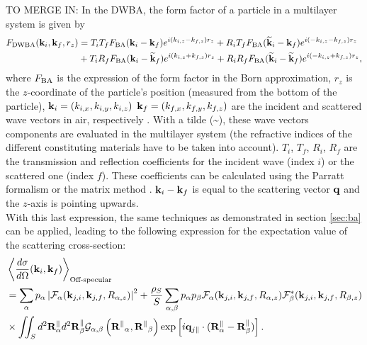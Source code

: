 TO MERGE IN:
In the DWBA, the form factor of a particle in a multilayer system is given by
\begin{align}
F_{\rm{DWBA}} (\mathbf{k}_i,\mathbf{k}_f, r_z) & = T_i T_f F_{\rm{BA}} (\mathbf{k}_i-\mathbf{k}_f) e^{i (k_{i,z}-k_{f,z}) r_z} + R_i T_f F_{\rm{BA}}(\mathbf{\widetilde{k}}_i-\mathbf{k}_f) e^{i(-k_{i,z}-k_{f,z})r_z}
 \nonumber \\
  &+ T_i R_f F_{\rm{BA}}(\mathbf{k}_i-\mathbf{\widetilde{k}}_f)e^{i(k_{i,z}+k_{f,z})r_z} + R_iR_fF_{\rm{BA}} (\mathbf{\widetilde{k}}_i-\mathbf{\widetilde{k}}_f)e^{i(-k_{i,z}+k_{f,z})r_z}, \label{eq:dwbageneral}
\end{align}
where $F_{\rm{BA}}$ is the expression of the form factor in the Born approximation, $r_z$ is the $z$-coordinate of the particle's position (measured from the bottom of the particle), $\mathbf{k}_i=(k_{i,x}, k_{i,y}, k_{i,z})$ $\mathbf{k}_f=(k_{f,x}, k_{f,y}, k_{f,z})$ are the incident and scattered wave vectors in air, respectively \cite{RaSS95}.
With a tilde (\~{}), these wave vectors components are evaluated in the multilayer system (the refractive indices of the different constituting materials have to be taken into account). 
$T_i$, $T_f$, $R_i$, $R_f$ are the transmission and reflection coefficients for the incident wave (index $i$) or the scattered one (index $f$). These coefficients can be calculated using the Parratt formalism \cite{Par54} or the matrix method \cite{BoWo99}. $\mathbf{k}_i-\mathbf{k}_f$ is equal to the scattering vector $\mathbf{q}$ and the $z$-axis is pointing upwards.\\

With this last expression, the same techniques as demonstrated in section \ref{sec:ba} can be applied, leading to the following expression for the expectation value of the scattering cross-section:
\begin{align*}
  & \left\langle \frac{d\sigma}{d\Omega}(\mathbf{k}_i,\mathbf{k}_f) \right\rangle_{\text{Off-specular}}  \\
  & = \sum_\alpha p_\alpha \left\lvert \mathcal{F}_\alpha(\mathbf{k}_{j,i},\mathbf{k}_{j,f}, R_{\alpha,z})\right\rvert ^2 + \frac{\rho_S}{S}\sum_{\alpha,\beta} p_\alpha p_\beta \mathcal{F}_\alpha (\mathbf{k}_{j,i},\mathbf{k}_{j,f}, R_{\alpha,z})\mathcal{F}_\beta^*(\mathbf{k}_{j,i},\mathbf{k}_{j,f}, R_{\beta,z}) \\
  & \times \iint_S d^2\mathbf{R}_\alpha^\parallel d^2\mathbf{R}_\beta^\parallel \mathcal{G}_{\alpha ,\beta}\left( \mathbf{R^\parallel}_{\alpha} , \mathbf{R^\parallel}_{\beta} \right) \exp \left[ i\mathbf{q}_{j\parallel}\cdot (\mathbf{R}_\alpha^\parallel - \mathbf{R}_\beta^\parallel ) \right].
\end{align*}

